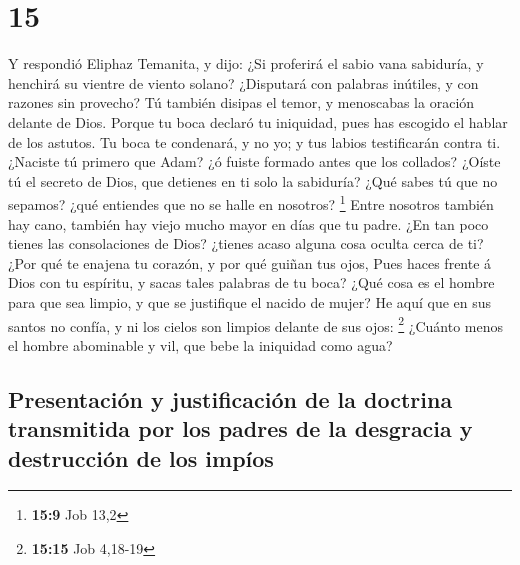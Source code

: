 \hypertarget{section-14}{%
\section{15}\label{section-14}}

 Y respondió Eliphaz Temanita, y dijo:  ¿Si
proferirá el sabio vana sabiduría, y henchirá su vientre de viento
solano?  ¿Disputará con palabras inútiles, y con razones sin
provecho?  Tú también disipas el temor, y menoscabas la
oración delante de Dios.  Porque tu boca declaró tu
iniquidad, pues has escogido el hablar de los astutos.  Tu
boca te condenará, y no yo; y tus labios testificarán contra ti.
 ¿Naciste tú primero que Adam? ¿ó fuiste formado antes que
los collados?  ¿Oíste tú el secreto de Dios, que detienes en
ti solo la sabiduría?  ¿Qué sabes tú que no sepamos? ¿qué
entiendes que no se halle en nosotros? \footnote{\textbf{15:9} Job 13,2}
 Entre nosotros también hay cano, también hay viejo mucho
mayor en días que tu padre.  ¿En tan poco tienes las
consolaciones de Dios? ¿tienes acaso alguna cosa oculta cerca de ti?
 ¿Por qué te enajena tu corazón, y por qué guiñan tus ojos,
 Pues haces frente á Dios con tu espíritu, y sacas tales
palabras de tu boca?  ¿Qué cosa es el hombre para que sea
limpio, y que se justifique el nacido de mujer?  He aquí
que en sus santos no confía, y ni los cielos son limpios delante de sus
ojos: \footnote{\textbf{15:15} Job 4,18-19}  ¿Cuánto menos
el hombre abominable y vil, que bebe la iniquidad como agua?

\hypertarget{presentaciuxf3n-y-justificaciuxf3n-de-la-doctrina-transmitida-por-los-padres-de-la-desgracia-y-destrucciuxf3n-de-los-impuxedos}{%
\subsection{Presentación y justificación de la doctrina transmitida por
los padres de la desgracia y destrucción de los
impíos}\label{presentaciuxf3n-y-justificaciuxf3n-de-la-doctrina-transmitida-por-los-padres-de-la-desgracia-y-destrucciuxf3n-de-los-impuxedos}}

